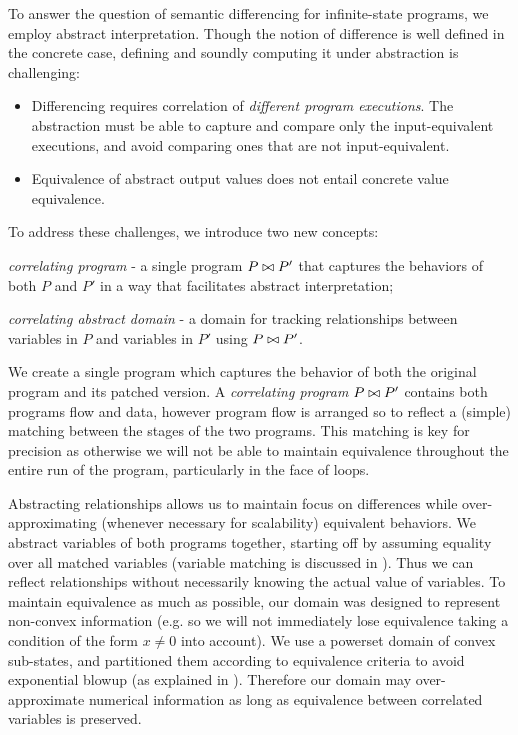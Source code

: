 To answer the question of semantic differencing for infinite-state programs, we employ abstract interpretation. Though the notion of difference is well defined in the concrete case, defining and soundly computing it under abstraction is challenging:
\begin{itemize}
\item Differencing requires correlation of \emph{different program executions}. The abstraction must be able to capture and compare only the input-equivalent executions, and avoid comparing ones that are not input-equivalent.
\item Equivalence of abstract output values does not entail concrete value equivalence.
\end{itemize}

To address these challenges, we introduce two new concepts:
\begin{inparaenum}[(i)]
\item \emph{correlating program} - a single program $P \bowtie P'$ that captures the behaviors of both $P$ and $P'$ in a way that facilitates abstract interpretation;
\item \emph{correlating abstract domain} - a domain for tracking relationships between variables in $P$ and variables in $P'$ using $P \bowtie P'$.
\end{inparaenum}

We create a single program which captures the behavior of both the original program and its patched version. A \emph{correlating program} $P \bowtie P'$ contains both programs flow and data, however program flow is arranged so to reflect a (simple) matching between the stages of the two programs. This matching is key for precision as otherwise we will not be able to maintain equivalence throughout the entire run of the program, particularly in the face of loops.

Abstracting relationships allows us to maintain focus on differences while over-approximating (whenever necessary for scalability) equivalent behaviors. We abstract variables of both programs together, starting off by assuming equality over all matched variables (variable matching is discussed in ). Thus we can
reflect relationships without necessarily knowing the actual value of
variables. To maintain equivalence as much as possible, our domain was designed to represent non-convex information (e.g. so we will not immediately lose equivalence taking a condition of the form $x \neq 0$ into account). We use a powerset domain of convex sub-states, and partitioned them according to equivalence criteria to avoid exponential blowup (as explained in ). Therefore our domain may over-approximate numerical information as long as equivalence between correlated variables is preserved.

